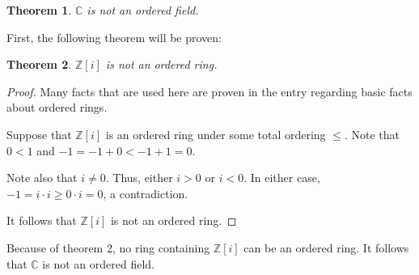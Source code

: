 \documentclass[12pt]{article}
\newtheorem{thm}{Theorem}
\begin{document}
\begin{thm}
$\mathbb{C}$ is not an ordered field.
\end{thm}

First, the following theorem will be proven:

\begin{thm}
$\mathbb{Z}[i]$ is not an ordered ring.
\end{thm}

\begin{proof}
Many facts that are used here are proven in the entry regarding basic facts about ordered rings.

Suppose that $\mathbb{Z}[i]$ is an ordered ring under some total ordering $\le$.  Note that $0<1$ and $-1=-1+0<-1+1=0.$

Note also that $i \neq 0$.  Thus, either $i>0$ or $i<0$.  In either case, $-1=i \cdot i \ge 0 \cdot i=0$, a contradiction.

It follows that $\mathbb{Z}[i]$ is not an ordered ring.
\end{proof}

Because of theorem 2, no ring containing $\mathbb{Z}[i]$ can be an ordered ring.  It follows that $\mathbb{C}$ is not an ordered field.
\end{document}

